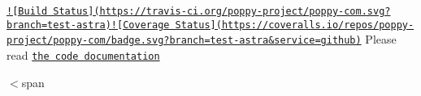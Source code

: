 \href{https://travis-ci.org/poppy-project/poppy-com}{\tt !\mbox{[}Build Status\mbox{]}(https\-://travis-\/ci.\-org/poppy-\/project/poppy-\/com.\-svg?branch=test-\/astra)}\href{https://coveralls.io/github/poppy-project/poppy-com?branch=test-astra}{\tt !\mbox{[}Coverage Status\mbox{]}(https\-://coveralls.\-io/repos/poppy-\/project/poppy-\/com/badge.\-svg?branch=test-\/astra\&service=github)} Please read \href{http://poppy-project.github.io/poppy-com/}{\tt the code documentation}

$<$span 